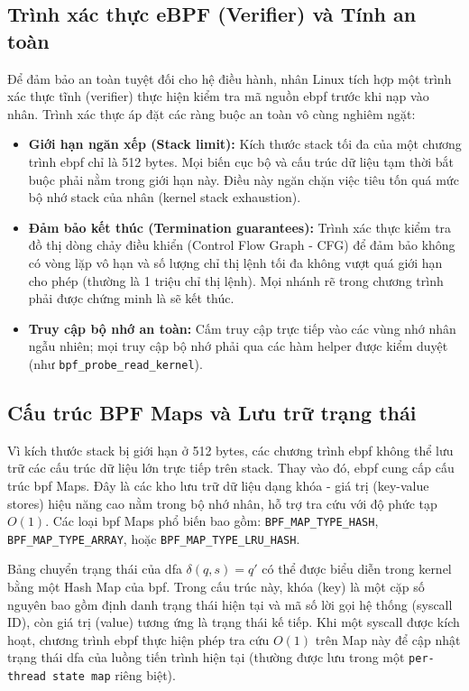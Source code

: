 \documentclass[../main.tex]{subfiles}
\begin{document}
\subsection{Trình xác thực eBPF (Verifier) và Tính an toàn}
Để đảm bảo an toàn tuyệt đối cho hệ điều hành, nhân Linux tích hợp
một trình xác thực tĩnh (verifier) thực hiện kiểm tra mã nguồn \gls{ebpf}
trước khi nạp vào nhân. Trình xác thực áp đặt các ràng buộc an toàn
vô cùng nghiêm ngặt:
\begin{itemize}
  \item \textbf{Giới hạn ngăn xếp (Stack limit):} Kích thước stack
    tối đa của một chương trình \gls{ebpf} chỉ là 512 bytes. Mọi biến cục
    bộ và cấu trúc dữ liệu tạm thời bắt buộc phải nằm trong giới hạn
    này. Điều này ngăn chặn việc tiêu tốn quá mức bộ nhớ stack của
    nhân (kernel stack exhaustion).
  \item \textbf{Đảm bảo kết thúc (Termination guarantees):} Trình xác
    thực kiểm tra đồ thị dòng chảy điều khiển (Control Flow Graph -
    CFG) để đảm bảo không có vòng lặp vô hạn và số lượng chỉ thị lệnh
    tối đa không vượt quá giới hạn cho phép (thường là 1 triệu chỉ
    thị lệnh). Mọi nhánh rẽ trong chương trình phải được chứng minh
    là sẽ kết thúc.
  \item \textbf{Truy cập bộ nhớ an toàn:} Cấm truy cập trực tiếp vào
    các vùng nhớ nhân ngẫu nhiên; mọi truy cập bộ nhớ phải qua các
    hàm helper được kiểm duyệt (như \texttt{bpf\_probe\_read\_kernel}).
\end{itemize}

\subsection{Cấu trúc BPF Maps và Lưu trữ trạng thái}
Vì kích thước stack bị giới hạn ở 512 bytes, các chương trình \gls{ebpf}
không thể lưu trữ các cấu trúc dữ liệu lớn trực tiếp trên stack. Thay
vào đó, \gls{ebpf} cung cấp cấu trúc \gls{bpf} Maps. Đây là các kho lưu trữ dữ
liệu dạng khóa - giá trị (key-value stores) hiệu năng cao nằm trong
bộ nhớ nhân, hỗ trợ tra cứu với độ phức tạp $O(1)$. Các loại \gls{bpf} Maps
phổ biến bao gồm: \texttt{BPF\_MAP\_TYPE\_HASH},
\texttt{BPF\_MAP\_TYPE\_ARRAY}, hoặc \texttt{BPF\_MAP\_TYPE\_LRU\_HASH}.

Bảng chuyển trạng thái của \gls{dfa} $\delta(q, s) = q'$ có thể được biểu
diễn trong kernel bằng một Hash Map của \gls{bpf}. Trong cấu trúc này, khóa
(key) là một cặp số nguyên bao gồm định danh trạng thái hiện tại và
mã số lời gọi hệ thống (\gls{syscall} ID), còn giá trị (value) tương ứng là
trạng thái kế tiếp. Khi một \gls{syscall} được kích hoạt, chương trình \gls{ebpf}
thực hiện phép tra cứu $O(1)$ trên Map này để cập nhật trạng thái \gls{dfa}
của luồng tiến trình hiện tại (thường được lưu trong một
\texttt{per-thread state map} riêng biệt).
\end{document}
